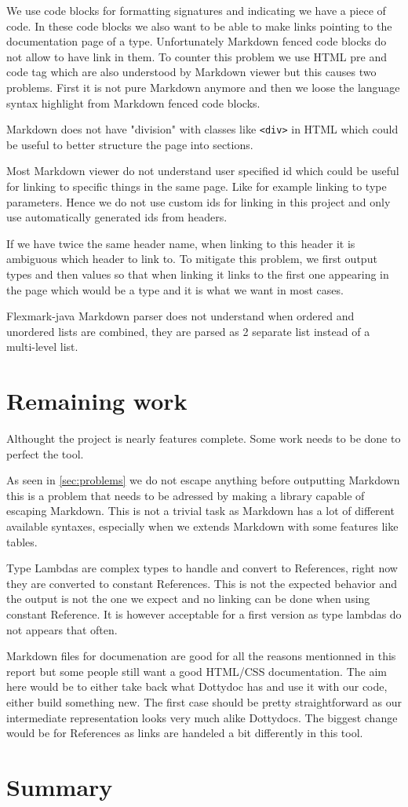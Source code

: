 \documentclass{report}
\begin{document}
We use code blocks for formatting signatures and indicating we have a piece of code. In these code blocks we also want to be able to make links pointing to the documentation page of a type. Unfortunately Markdown fenced code blocks do not allow to have link in them. To counter this problem we use HTML pre and code tag which are also understood by Markdown viewer but this causes two problems. First it is not pure Markdown anymore and then we loose the language syntax highlight from Markdown fenced code blocks.

Markdown does not have "division" with classes like \texttt{<div>} in HTML which could be useful to better structure the page into sections.

Most Markdown viewer do not understand user specified id which could be useful for linking to specific things in the same page. Like for example linking to type parameters. Hence we do not use custom ids for linking in this project and only use automatically generated ids from headers.

If we have twice the same header name, when linking to this header it is ambiguous which header to link to. To mitigate this problem, we first output types and then values so that when linking it links to the first one appearing in the page which would be a type and it is what we want in most cases.

Flexmark-java Markdown parser does not understand when ordered and unordered lists are combined, they are parsed as 2 separate list instead of a multi-level list.

\chapter{Remaining work}
Althought the project is nearly features complete. Some work needs to be done to perfect the tool.

As seen in \autoref{sec:problems} we do not escape anything before outputting Markdown this is a problem that needs to be adressed by making a library capable of escaping Markdown. This is not a trivial task as Markdown has a lot of different available syntaxes, especially when we extends Markdown with some features like tables.

Type Lambdas are complex types to handle and convert to References, right now they are converted to constant References. This is not the expected behavior and the output is not the one we expect and no linking can be done when using constant Reference. It is however acceptable for a first version as type lambdas do not appears that often.

Markdown files for documenation are good for all the reasons mentionned in this report but some people still want a good HTML/CSS documentation. The aim here would be to either take back what Dottydoc has and use it with our code, either build something new. The first case should be pretty straightforward as our intermediate representation looks very much alike Dottydocs. The biggest change would be for References as links are handeled a bit differently in this tool.

\chapter{Summary}
\end{document}
